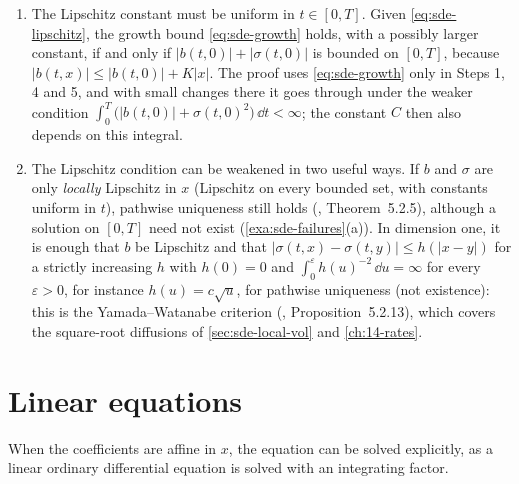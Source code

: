 \begin{remark}\label{rem:sde-hypotheses}
\leavevmode
\begin{enumerate}[label=(\alph*)]
  \item The Lipschitz constant must be uniform in $t\in[0,T]$. Given
    \eqref{eq:sde-lipschitz}, the growth bound \eqref{eq:sde-growth} holds, with a possibly larger constant, if and only if
    $|b(t,0)|+|\sigma(t,0)|$ is bounded on $[0,T]$, because
    $|b(t,x)|\le|b(t,0)|+K|x|$. The proof uses \eqref{eq:sde-growth} only in Steps 1, 4 and
    5, and with small changes there it goes through under the weaker condition
    $\int_0^T\big(|b(t,0)|+\sigma(t,0)^2\big)\,\dd t<\infty$; the constant $C$ then also
    depends on this integral.
  \item The Lipschitz condition can be weakened in two useful ways. If $b$ and $\sigma$ are
    only \emph{locally} Lipschitz in $x$ (Lipschitz on every bounded set, with constants
    uniform in $t$), pathwise uniqueness still holds (\textcite{karatzas-shreve},
    Theorem~5.2.5), although a solution on $[0,T]$ need not exist
    (\cref{exa:sde-failures}(a)). In dimension one, it is enough that $b$ be Lipschitz and
    that $|\sigma(t,x)-\sigma(t,y)|\le h(|x-y|)$ for a strictly increasing $h$ with
    $h(0)=0$ and $\int_0^\varepsilon h(u)^{-2}\,\dd u=\infty$ for every $\varepsilon>0$, for
    instance $h(u)=c\sqrt u$, for pathwise uniqueness (not existence): this is the
    Yamada--Watanabe criterion (\textcite{karatzas-shreve}, Proposition~5.2.13), which covers the square-root
    diffusions of \cref{sec:sde-local-vol} and \cref{ch:14-rates}.
\end{enumerate}
\end{remark}

\section{Linear equations}\label{sec:sde-linear}

When the coefficients are affine in $x$, the equation can be solved explicitly, as a linear
ordinary differential equation is solved with an integrating factor.

